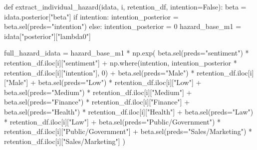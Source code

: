 \documentclass[
  letterpaper,
  DIV=11,
  numbers=noendperiod]{scrartcl}
\newenvironment{Shaded}{\begin{snugshade}}{\end{snugshade}}
\newcommand{\ControlFlowTok}[1]{\textcolor[rgb]{0.00,0.23,0.31}{#1}}
\newcommand{\DecValTok}[1]{\textcolor[rgb]{0.68,0.00,0.00}{#1}}
\newcommand{\KeywordTok}[1]{\textcolor[rgb]{0.00,0.23,0.31}{#1}}
\newcommand{\NormalTok}[1]{\textcolor[rgb]{0.00,0.23,0.31}{#1}}
\newcommand{\OperatorTok}[1]{\textcolor[rgb]{0.37,0.37,0.37}{#1}}
\newcommand{\StringTok}[1]{\textcolor[rgb]{0.13,0.47,0.30}{#1}}
\newcommand{\VariableTok}[1]{\textcolor[rgb]{0.07,0.07,0.07}{#1}}
\begin{document}
\begin{Shaded}
\begin{Highlighting}[]
\KeywordTok{def}\NormalTok{ extract\_individual\_hazard(idata, i, retention\_df, intention}\OperatorTok{=}\VariableTok{False}\NormalTok{):}
\NormalTok{    beta }\OperatorTok{=}\NormalTok{ idata.posterior[}\StringTok{"beta"}\NormalTok{]}
    \ControlFlowTok{if}\NormalTok{ intention:}
\NormalTok{        intention\_posterior }\OperatorTok{=}\NormalTok{ beta.sel(preds}\OperatorTok{=}\StringTok{"intention"}\NormalTok{)}
    \ControlFlowTok{else}\NormalTok{:}
\NormalTok{        intention\_posterior }\OperatorTok{=} \DecValTok{0}
\NormalTok{    hazard\_base\_m1 }\OperatorTok{=}\NormalTok{ idata[}\StringTok{"posterior"}\NormalTok{][}\StringTok{"lambda0"}\NormalTok{]}

\NormalTok{    full\_hazard\_idata }\OperatorTok{=}\NormalTok{ hazard\_base\_m1 }\OperatorTok{*}\NormalTok{ np.exp(}
\NormalTok{        beta.sel(preds}\OperatorTok{=}\StringTok{"sentiment"}\NormalTok{) }\OperatorTok{*}\NormalTok{ retention\_df.iloc[i][}\StringTok{"sentiment"}\NormalTok{]}
        \OperatorTok{+}\NormalTok{ np.where(intention, intention\_posterior }\OperatorTok{*}\NormalTok{ retention\_df.iloc[i][}\StringTok{"intention"}\NormalTok{], }\DecValTok{0}\NormalTok{)}
        \OperatorTok{+}\NormalTok{ beta.sel(preds}\OperatorTok{=}\StringTok{"Male"}\NormalTok{) }\OperatorTok{*}\NormalTok{ retention\_df.iloc[i][}\StringTok{"Male"}\NormalTok{]}
        \OperatorTok{+}\NormalTok{ beta.sel(preds}\OperatorTok{=}\StringTok{"Low"}\NormalTok{) }\OperatorTok{*}\NormalTok{ retention\_df.iloc[i][}\StringTok{"Low"}\NormalTok{]}
        \OperatorTok{+}\NormalTok{ beta.sel(preds}\OperatorTok{=}\StringTok{"Medium"}\NormalTok{) }\OperatorTok{*}\NormalTok{ retention\_df.iloc[i][}\StringTok{"Medium"}\NormalTok{]}
        \OperatorTok{+}\NormalTok{ beta.sel(preds}\OperatorTok{=}\StringTok{"Finance"}\NormalTok{) }\OperatorTok{*}\NormalTok{ retention\_df.iloc[i][}\StringTok{"Finance"}\NormalTok{]}
        \OperatorTok{+}\NormalTok{ beta.sel(preds}\OperatorTok{=}\StringTok{"Health"}\NormalTok{) }\OperatorTok{*}\NormalTok{ retention\_df.iloc[i][}\StringTok{"Health"}\NormalTok{]}
        \OperatorTok{+}\NormalTok{ beta.sel(preds}\OperatorTok{=}\StringTok{"Law"}\NormalTok{) }\OperatorTok{*}\NormalTok{ retention\_df.iloc[i][}\StringTok{"Law"}\NormalTok{]}
        \OperatorTok{+}\NormalTok{ beta.sel(preds}\OperatorTok{=}\StringTok{"Public/Government"}\NormalTok{) }\OperatorTok{*}\NormalTok{ retention\_df.iloc[i][}\StringTok{"Public/Government"}\NormalTok{]}
        \OperatorTok{+}\NormalTok{ beta.sel(preds}\OperatorTok{=}\StringTok{"Sales/Marketing"}\NormalTok{) }\OperatorTok{*}\NormalTok{ retention\_df.iloc[i][}\StringTok{"Sales/Marketing"}\NormalTok{]}
\NormalTok{    )}


\end{Highlighting}
\end{Shaded}
\end{document}
